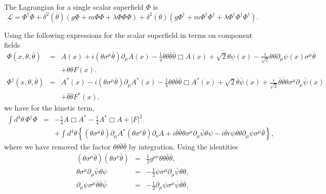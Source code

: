 \documentclass[notes.tex]{subfiles}
\begin{document}
\begin{Answer}
The Lagrangian for a single scalar superfield $\Phi$ is
\begin{equation}
\mathcal{L}=\Phi^\dagger \Phi + \delta^2(\bar{\theta}) (g\Phi+m\Phi\Phi+\lambda\Phi\Phi\Phi) + \delta^2(\theta) (g\Phi^\dagger+m\Phi^\dagger\Phi^\dagger+\lambda\Phi^\dagger\Phi^\dagger\Phi^\dagger). 
\end{equation}

Using the following expressions for the scalar superfield in terms on component fields
\begin{eqnarray}
\Phi(x, \theta, \bar{\theta}) &=& A(x) + i(\theta\sigma^\mu \bar{\theta})\partial_\mu A(x) - \frac{1}{4}\theta\theta\bar{\theta}\bar{\theta}\Box A(x) + \sqrt{2}\theta \psi(x) - \frac{i}{\sqrt{2}}\theta\theta\partial_\mu \psi(x)\sigma^\mu\bar{\theta} \nonumber\\
&&+ \theta\theta F(x).\nonumber\\
\Phi^\dagger (x, \theta, \bar{\theta}) &=& A^*(x) - i(\theta\sigma^\mu \bar{\theta})\partial_\mu A^*(x) - \frac{1}{4}\theta\theta\bar{\theta}\bar{\theta}\Box A^*(x) + \sqrt{2}\bar{\theta}\bar{\psi}(x) + \frac{i}{\sqrt{2}}\bar{\theta}\bar{\theta}\theta \sigma^\mu\partial_\mu \bar{\psi}(x)\nonumber\\
&& +\bar{\theta}\bar{\theta} F^*(x).\nonumber
\end{eqnarray}
we have for the kinetic term,
\begin{eqnarray}
\int d^4\theta \,\Phi^\dagger\Phi&=& - \frac{1}{4}A\Box A^* -\frac{1}{4} A^*\Box A  +  |F|^2 \nonumber \\
&&+\int d^4\theta \left\{ (\theta\sigma^\mu \bar{\theta})\partial_\mu A^*(\theta\sigma^\nu \bar{\theta})\partial_\nu A
+i\bar{\theta}\bar{\theta}\theta \sigma^\mu\partial_\mu \bar{\psi}\theta \psi - i\bar{\theta}r{\psi}\theta\theta\partial_\mu \psi\sigma^\mu\bar{\theta}\right\},\nonumber
\end{eqnarray}
where we have removed the factor $\theta\theta\bar{\theta}\bar{\theta}$ by integration. Using the identities
\begin{eqnarray}
(\theta\sigma^\mu \bar{\theta})(\theta\sigma^\nu \bar{\theta})&=&\frac{1}{2}g^{\mu\nu}\theta\theta\bar{\theta}\bar{\theta},\\
\theta\sigma^\mu\partial_\mu \bar\psi \theta\psi &=& -\frac{1}{2}\psi\sigma^\mu\partial_\mu \bar\psi \theta\theta,\\
\partial_\mu\psi\sigma^\mu \bar\theta \bar\theta\bar\psi &=& -\frac{1}{2}\partial_\mu\psi\sigma^\mu \bar\psi \bar\theta\bar\theta,

\end{eqnarray}
\end{Answer}
\end{document}
